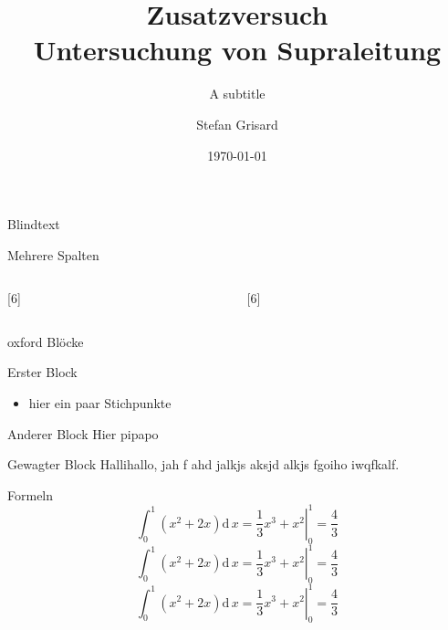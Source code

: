 \documentclass[aspectratio=1610]{beamer}
\title[Short version]{Zusatzversuch \\ Untersuchung von Supraleitung}
\subtitle[short version]{A subtitle}
\date{\today}
\author[M. Maier]{Stefan Grisard}
\begin{document}
\frame{\maketitle}


\begin{frame}{Blindtext}
\blindtext

\end{frame}

\begin{frame}{Mehrere Spalten}
\begin{columns}[onlytextwidth]
\begin{column}{0.45\textwidth}
[6]
\end{column}
\begin{column}{0.45\textwidth}
[6]
\end{column}
\end{columns}
\end{frame}

\begin{frame}{oxford Blöcke}
\begin{block}{Erster Block}
\begin{itemize}
  \item hier ein paar Stichpunkte
\end{itemize}
\end{block}
\begin{exampleblock}{Anderer Block}
Hier pipapo
\end{exampleblock}
\begin{alertblock}{Gewagter Block}
Hallihallo, jah f ahd jalkjs aksjd alkjs fgoiho iwqfkalf.
\end{alertblock}
\end{frame}

\begin{frame}{Formeln}
\begin{equation}
  \int_{0}^{1}  (x^2 + 2x)\mathup{d}\, x = \left. \frac{1}{3}x^3 + x^2\right|_0^{1} = \frac{4}{3}
\end{equation}
\begin{equation}
  \int_{0}^{1}  (x^2 + 2x)\mathup{d}\, x = \left. \frac{1}{3}x^3 + x^2\right|_0^{1} = \frac{4}{3}
\end{equation}
\begin{equation}
  \int_{0}^{1}  (x^2 + 2x)\mathup{d}\, x = \left. \frac{1}{3}x^3 + x^2\right|_0^{1} = \frac{4}{3}
\end{equation}
\end{frame}
\end{document}

